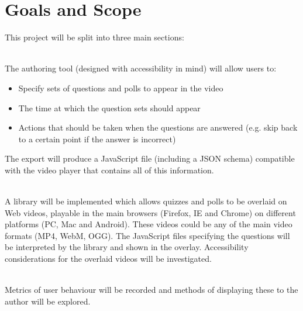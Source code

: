 \section{Goals and Scope} 
\label{Section:Goals and Scope}
This project will be split into three main sections:
\begin{description}[%
  before={\setcounter{descriptcount}{0}},%
  ,font=\bfseries\stepcounter{descriptcount}\thedescriptcount~]
\item[Quiz Authoring Tool] \hfill \\
The authoring tool (designed with accessibility in mind) will allow users to:
\begin{itemize}
\item Specify sets of questions and polls to appear in the video
\item The time at which the question sets should appear
\item Actions that should be taken when the questions are answered (e.g. skip back to a certain point if the answer is incorrect)
\end{itemize}
The export will produce a JavaScript file (including a JSON schema) compatible with the video player that contains all of this information. 
\item[Overlaid Video Player] \hfill \\
A library will be implemented which allows quizzes and polls to be overlaid on Web videos, playable in the main browsers (Firefox, IE and Chrome) on different platforms (PC, Mac and Android). These videos could be any of the main video formats (MP4, WebM, OGG). The JavaScript files specifying the questions will be interpreted by the library and shown in the overlay. Accessibility considerations for the overlaid videos will be investigated.
\item[Video and Quiz Analytics] \hfill \\
Metrics of user behaviour will be recorded and methods of displaying these to the author will be explored.
\end{description}